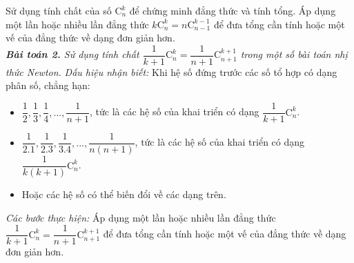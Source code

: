 \begin{dang}{Sử dụng tính chất của số $\mathrm{C}_n^k$ để chứng minh đẳng thức và tính tổng.}
    Áp dụng một lần hoặc nhiều lần đẳng thức $k \mathrm{C}_n^k=n \mathrm{C}_{n-1}^{k-1}$ để đưa tổng cần tính hoặc một vế của đẳng thức về dạng đơn giản hơn.\\
    \textit{\textbf{Bài toán 2.} Sử dụng tính chất $\dfrac1{k+1}\mathrm{C}_n^k=\dfrac1{n+1}\mathrm{C}_{n+1}^{k+1}$ trong một số bài toán nhị thức Newton.}
    \textit{Dấu hiệu nhận biết: }Khi hệ số đứng trước các số tổ hợp có dạng phân số, chẳng hạn: 
    \begin{itemize}
        \item $\dfrac12, \dfrac1{3}, \dfrac1{4},..., \dfrac1{n+1}$, tức là các hệ số của khai triển có dạng $\dfrac1{k+1}\mathrm{C}_n^{k}$.
        \item $\dfrac1{2.1}, \dfrac1{2.3}, \dfrac1{3.4},...,\dfrac1{n(n+1)}$, tức là các hệ số của khai triển có dạng $\dfrac1{k(k+1)}\mathrm{C}_n^{k}$.
        \item Hoặc các hệ số có thể biến đổi về các dạng trên.
    \end{itemize}
    \textit{Các bước thực hiện:} Áp dụng một lần hoặc nhiều lần đẳng thức $\dfrac1{k+1}\mathrm{C}_n^k=\dfrac1{n+1}\mathrm{C}_{n+1}^{k+1}$ để đưa tổng cần tính hoặc một vế của đẳng thức về dạng đơn giản hơn.\\
\end{dang}

